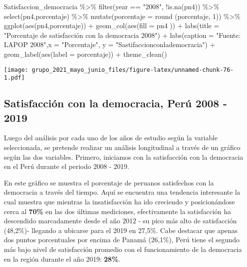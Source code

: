 \documentclass[
]{book}
\newenvironment{Shaded}{\begin{snugshade}}{\end{snugshade}}
\newcommand{\AttributeTok}[1]{\textcolor[rgb]{0.77,0.63,0.00}{#1}}
\newcommand{\DecValTok}[1]{\textcolor[rgb]{0.00,0.00,0.81}{#1}}
\newcommand{\FunctionTok}[1]{\textcolor[rgb]{0.00,0.00,0.00}{#1}}
\newcommand{\NormalTok}[1]{#1}
\newcommand{\SpecialCharTok}[1]{\textcolor[rgb]{0.00,0.00,0.00}{#1}}
\newcommand{\StringTok}[1]{\textcolor[rgb]{0.31,0.60,0.02}{#1}}
\begin{document}
\begin{Shaded}
\begin{Highlighting}[]
\NormalTok{Satisfaccion\_democracia }\SpecialCharTok{\%\textgreater{}\%}
  \FunctionTok{filter}\NormalTok{(year }\SpecialCharTok{==} \StringTok{"2008"}\NormalTok{,  }\SpecialCharTok{!}\FunctionTok{is.na}\NormalTok{(pn4)) }\SpecialCharTok{\%\textgreater{}\%}
  \FunctionTok{select}\NormalTok{(pn4,porcentaje) }\SpecialCharTok{\%\textgreater{}\%}
  \FunctionTok{mutate}\NormalTok{(}\AttributeTok{porcentaje =} \FunctionTok{round}\NormalTok{ (porcentaje, }\DecValTok{1}\NormalTok{)) }\SpecialCharTok{\%\textgreater{}\%}
  \FunctionTok{ggplot}\NormalTok{(}\FunctionTok{aes}\NormalTok{(pn4,porcentaje)) }\SpecialCharTok{+} 
  \FunctionTok{geom\_col}\NormalTok{(}\FunctionTok{aes}\NormalTok{(}\AttributeTok{fill =}\NormalTok{ pn4 )) }\SpecialCharTok{+} 
  \FunctionTok{labs}\NormalTok{(}\AttributeTok{title =} \StringTok{"Porcentaje de satisfacción con la democracia 2008"}\NormalTok{) }\SpecialCharTok{+}
  \FunctionTok{labs}\NormalTok{(}\AttributeTok{caption =} \StringTok{"Fuente: LAPOP 2008"}\NormalTok{,}\AttributeTok{x =} \StringTok{"Porcentaje"}\NormalTok{, }\AttributeTok{y =} \StringTok{"Sastifaccionconlademocracia"}\NormalTok{) }\SpecialCharTok{+}
  \FunctionTok{geom\_label}\NormalTok{(}\FunctionTok{aes}\NormalTok{(}\AttributeTok{label =}\NormalTok{ porcentaje)) }\SpecialCharTok{+}
  \FunctionTok{theme\_clean}\NormalTok{()}
\end{Highlighting}
\end{Shaded}

\texttt{[image: grupo\_2021\_mayo\_junio\_files/figure-latex/unnamed-chunk-76-1.pdf]}

\hypertarget{satisfacciuxf3n-con-la-democracia-peruxfa-2008---2019}{%
\subsection{Satisfacción con la democracia, Perú 2008 - 2019}\label{satisfacciuxf3n-con-la-democracia-peruxfa-2008---2019}}

Luego del análisis por cada uno de los años de estudio según la variable seleccionada, se pretende realizar un análisis longitudinal a través de un gráfico según las dos variables. Primero, iniciamos con la satisfacción con la democracia en el Perú durante el periodo 2008 - 2019.

En este gráfico se muestra el porcentaje de peruanos satisfechos con la democracia a través del tiempo. Aquí se encuentra una tendencia interesante la cual muestra que mientras la insatisfacción ha ido creciendo y posicionándose cerca al \textbf{70\%} en las dos últimas mediciones, efectivamente la satisfacción ha descendido marcadamente desde el año 2012 - su pico más alto de satisfacción (48,2\%)- llegando a ubicarse para el 2019 en 27,5\%. Cabe destacar que apenas dos puntos porcentuales por encima de Panamá (26,1\%), Perú tiene el segundo más bajo nivel de satisfacción promedio con el funcionamiento de la democracia en la región durante el año 2019: \textbf{28\%}.
\end{document}
